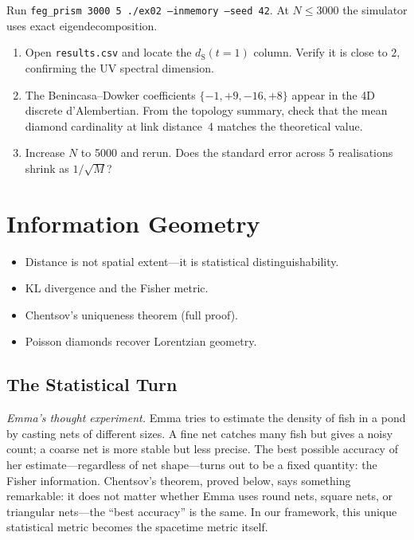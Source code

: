 \documentclass[11pt, a4paper, openany]{book}
\newcommand{\dS}{d_{\mathrm{S}}}
\newenvironment{introduction}[1][Modulo Overview]{%
  \begin{tcolorbox}[
    enhanced,colback=structure!5,colframe=structure,
    colbacktitle=structure,coltitle=white,
    fonttitle=\small\bfseries,title={#1},
    arc=2pt,boxrule=0.7pt,
    left=8pt,right=8pt,top=6pt,bottom=6pt,
    before skip=12pt,after skip=12pt
  ]\itshape\begin{itemize}[leftmargin=*,itemsep=2pt,parsep=0pt]
}{%
  \end{itemize}\end{tcolorbox}
}
\begin{document}
\begin{simulation}
Run \texttt{feg\_prism 3000 5 ./ex02 --inmemory --seed 42}.
At $N \leq 3000$ the simulator uses exact eigendecomposition.
\begin{enumerate}
\item Open \texttt{results.csv} and locate the $\dS(t{=}1)$ column. Verify it is close to $2$, confirming the UV spectral dimension.
\item The Benincasa--Dowker coefficients $\{-1, +9, -16, +8\}$ appear in the 4D discrete d'Alembertian. From the topology summary, check that the mean diamond cardinality at link distance~4 matches the theoretical value.
\item Increase $N$ to 5000 and rerun. Does the standard error across 5 realisations shrink as $1/\sqrt{M}$?
\end{enumerate}
\end{simulation}


\chapter{Information Geometry}\label{ch:info-geom}

\begin{introduction}
  \item Distance is not spatial extent---it is statistical distinguishability.
  \item KL divergence and the Fisher metric.
  \item Chentsov's uniqueness theorem (full proof).
  \item Poisson diamonds recover Lorentzian geometry.
\end{introduction}

\section{The Statistical Turn}

\smallskip\noindent
\textit{Emma's thought experiment.}
Emma tries to estimate the density of fish in a pond by casting nets of
different sizes. A fine net catches many fish but gives a noisy count; a
coarse net is more stable but less precise. The best possible accuracy
of her estimate---regardless of net shape---turns out to be a fixed
quantity: the Fisher information. Chentsov's theorem, proved below, says
something remarkable: it does not matter whether Emma uses round nets,
square nets, or triangular nets---the ``best accuracy'' is the same. In
our framework, this unique statistical metric becomes the spacetime
metric itself.
\smallskip
\end{document}
